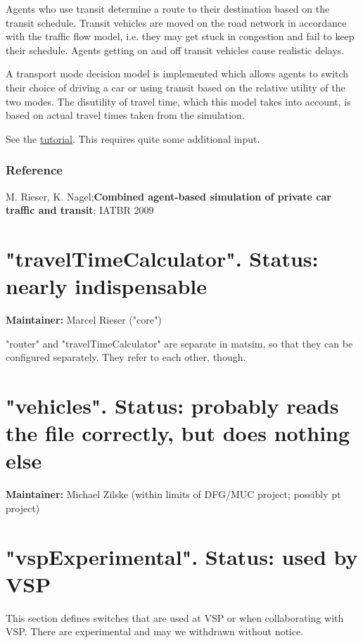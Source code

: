 \documentclass[a4paper,11pt]{report}
\begin{document}
Agents who use transit determine a route to their destination based  on the transit schedule. Transit vehicles are moved on the road network  in accordance with the traffic flow model, i.e. they may get stuck in  congestion and fail to keep their schedule. Agents getting on and off  transit vehicles cause realistic delays.

A transport mode decision model is implemented which allows agents to  switch their choice of driving a car or using transit based on the  relative utility of the two modes. The disutility of travel time, which  this model takes into account, is based on actual travel times taken  from the simulation.

See the \href{http://matsim.org/docs/tutorials/transit}{tutorial}. This requires quite some additional input.

\subsubsection{Reference}

M. Rieser, K. Nagel;\textbf{Combined agent-based simulation of private car traffic and transit}; IATBR 2009

\vfill\eject
\section{"travelTimeCalculator". Status: nearly indispensable}

\textbf{Maintainer:} Marcel Rieser ("core")

"router" and "travelTimeCalculator" are separate in matsim, so that  they can be configured separately. They refer to each other,  though.

\vfill\eject
\section{"vehicles". Status: probably reads the file correctly, but does nothing else}

\textbf{Maintainer:} Michael Zilske (within limits of DFG/MUC project; possibly pt project)

\vfill\eject
\section{"vspExperimental". Status: used by VSP}

This  section defines switches that are used at VSP or when collaborating  with VSP. There are experimental and may we withdrawn without  notice.
\end{document}
